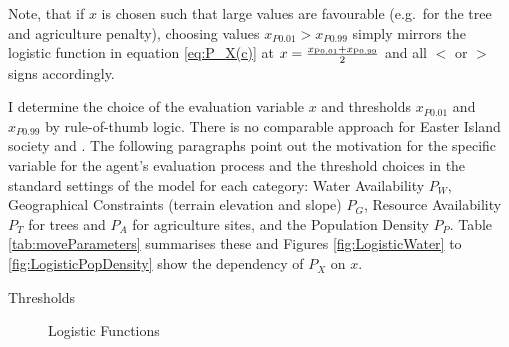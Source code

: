 Note, that if $x$ is chosen such that large values are favourable (e.g.\ for the tree and agriculture penalty), choosing values $x_{P0.01}>x_{P0.99}$ simply mirrors the logistic function in equation \ref{eq:P_X(c)} at $x=\frac{x_{\rm P0.01}+x_{\rm P0.99}}{2}$ and all $<$ or $>$ signs accordingly.


I determine the choice of the evaluation variable $x$ and thresholds $x_{P0.01}$ and $x_{P0.99}$ by rule-of-thumb logic.
There is no comparable approach for Easter Island society and .
The following paragraphs point out the motivation for the specific variable for the agent's evaluation process and the threshold choices in the standard settings of the model for each category: Water Availability $P_W$, Geographical Constraints (terrain elevation and slope) $P_G$, Resource Availability $P_T$ for trees and $P_A$ for agriculture sites, and the Population Density $P_P$. 
Table \ref{tab:moveParameters} summarises these and Figures \ref{fig:LogisticWater} to \ref{fig:LogisticPopDensity} show the dependency of $P_X$ on $x$.

\begin{table}
	Thresholds
	\label{tab:moveParameters}
\end{table}

\begin{figure}
	Logistic Functions
	\label{fig:Logistic}
\end{figure}

